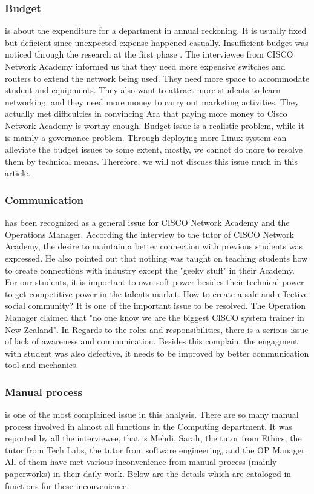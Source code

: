 \subsubsection{Budget} is about the expenditure for a department in annual reckoning. It is usually fixed but deficient since unexpected expense happened casually. Insufficient budget was noticed through the research at the first phase . The interviewee from CISCO Network Academy informed us that they need more expensive switches and routers to extend the network being used. They need more space to accommodate student and equipments. They also want to attract more students to learn networking, and they need more money to carry out marketing activities. They actually met difficulties in convincing Ara that paying more money to Cisco Network Academy is worthy enough. Budget issue is a realistic problem, while it is mainly a governance problem. Through deploying more Linux system can alleviate the budget issues to some extent, mostly, we cannot do more to resolve them by technical means. Therefore, we will not discuss this issue much in this article.

\subsubsection{Communication} has been recognized as a general issue for CISCO Network Academy and the Operations Manager. According the interview to the tutor of CISCO Network Academy, the desire to maintain a better connection with previous students was expressed. He also pointed out that nothing was taught on teaching students how to create connections with industry except the "geeky stuff" in their Academy. For our students, it is important to own soft power besides their technical power to get competitive power in the talents market. How to create a safe and effective social community? It is one of the important issue to be resolved. The Operation Manager claimed that "no one know we are the biggest CISCO system trainer in New Zealand". In Regards to the roles and responsibilities, there is a serious issue of lack of awareness and communication. Besides this complain, the engagment with student was also defective, it needs to be improved by better communication tool and mechanics.

\subsubsection{Manual process} is one of the most complained issue in this analysis. There are so many manual process involved in almost all functions in the Computing department. It was reported by all the interviewee, that is Mehdi, Sarah, the tutor from Ethics, the tutor from Tech Labs, the tutor from software engineering, and the OP Manager. All of them have met various inconvenience from manual process (mainly paperworks) in their daily work. Below are the details which are cataloged in functions for these inconvenience.

